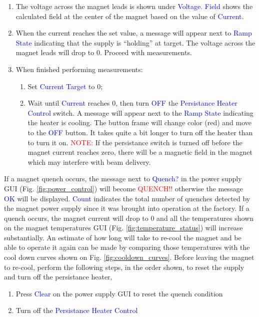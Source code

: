 {\begin{enumerate}
\item The voltage across the magnet leads is shown under \textcolor{blue}{Voltage}. \textcolor{blue}{Field} shows the calculated field at the center of the magnet based on the value of \textcolor{blue}{Current}.
\item When the current reaches the set value, a message will appear next to \textcolor{blue}{Ramp State} indicating that the supply is ``holding'' at target. The voltage across the magnet leads will drop to 0. Proceed with measurements.
\item When finished performing measurements:
\vspace{-\parskip}
\begin{enumerate}
\item Set \textcolor{blue}{Current Target} to 0;
\item Wait until \textcolor{blue}{Current} reaches 0, then turn \textcolor{blue}{OFF} the \textcolor{blue}{Persistance Heater Control} switch. A message will appear next to the \textcolor{blue}{Ramp State} indicating the heater is cooling. The button frame will change color (red) and move to the \textcolor{blue}{OFF} button. It takes quite a bit longer to turn off the heater than to turn it on.\hfill\break
\textcolor{red}{NOTE:} If the persistance switch is turned off before the magnet current reaches zero, there will be a magnetic field in the magnet which may interfere with beam delivery.
\end{enumerate}
\end{enumerate}

If a magnet quench occurs, the message next to \textcolor{blue}{Quench?} in the power supply GUI (Fig. \ref{fig:power_control}) will become \textcolor{red}{QUENCH!!} otherwise the message \textcolor{blue}{OK} will be displayed. \textcolor{blue}{Count} indicates the total number of quenches detected by the magnet power supply since it was brought into operation at the factory. If a quench occurs, the magnet current will drop to 0 and all the temperatures shown on the magnet temperatures GUI (Fig. \ref{fig:temperature_status}) will increase substantially.
An estimate of how long will take to re-cool the magnet and be able to operate it again can be made by comparing those temperatures with the cool down curves shown on Fig. \ref{fig:cooldown_curves}. \color{blue}Before leaving the magnet to re-cool, perform the following steps, in the order shown, to reset the supply and turn off the persistance heater,\color{black}\ 
\vspace{-\parskip}
\begin{enumerate}
\item Press \textcolor{blue}{Clear} on the power supply GUI  to reset the quench condition
\item Turn off the \textcolor{blue}{Persistance Heater Control}
\end{enumerate}

}
